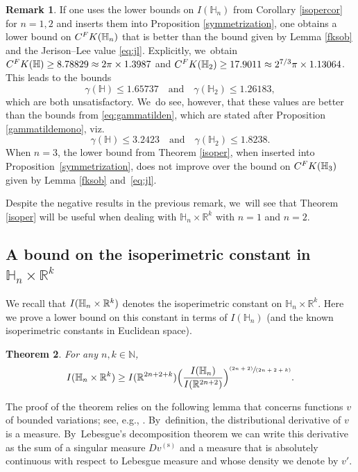 \documentclass[11pt]{article}
\let\oldsfrac\sfrac
\renewcommand{\sfrac}[2]{{\oldsfrac{#1}{#2}}}
\newcommand{\pspfrac}[2]{{\sfrac{(#1)}{(#2)}}}
\newcommand{\FK}{\textup{FK}}
\newtheorem{theorem}{Theorem}[section]
\theoremstyle{definition}
\newtheorem{remark}[theorem]{Remark}
\newcommand{\1}{\mathbbm{1}}
\newcommand{\N}{\mathbb{N}}
\newcommand{\R}{\mathbb{R}}
\numberwithin{equation}{section}
\begin{document}
\begin{remark}
If one uses the lower bounds on $I(\mathbb H_n)$ from Corollary \ref{isopercor} for $n=1,2$ and inserts them into Proposition \ref{symmetrization}, one obtains a lower bound on $C^\FK(\mathbb H_n)$ that is better than the bound given by Lemma \ref{fksob} and the Jerison--Lee value \eqref{eq:jl}. Explicitly, we~obtain $C^\FK(\mathbb H) \geq 8.78829 \approx 2\pi \times 1.3987$ and $C^\FK(\mathbb H_2) \geq 17.9011 \approx 2^{7/3} \pi \times 1.13064$. This leads to the bounds
\[
\gamma(\mathbb H) \leq 1.65737
\quad\text{and}\quad
\gamma(\mathbb H_2) \leq 1.26183,
\]
which are both unsatisfactory. We~do see, however, that these values are better than the bounds from \eqref{eq:gammatilden}, which are stated after Proposition \ref{gammatildemono}, viz.
\[
\gamma(\mathbb H) \leq 3.2423
\quad\text{and}\quad
\gamma(\mathbb H_2) \leq 1.8238.
\]
When $n=3$, the lower bound from Theorem \ref{isoper}, when inserted into Proposition~\ref{symmetrization}, does not improve over the bound on $C^\FK(\mathbb H_3)$ given by Lemma \ref{fksob} and~\eqref{eq:jl}.
\end{remark}

Despite the negative results in the previous remark, we~will see that Theorem \ref{isoper} will be useful when dealing with $\mathbb H_n\times\R^k$ with $n=1$ and $n=2$.

\subsection{A bound on the isoperimetric constant in $\mathbb H_n\times\R^k$}\label{sec:maincompn12}
We recall that $I(\mathbb H_n\times\nobreak\R^k)$ denotes the isoperimetric constant on $\mathbb H_n\times\R^k$. Here we prove a lower bound on this constant in terms of $I(\mathbb H_n)$ (and the known isoperimetric constants in Euclidean space).

\begin{theorem}\label{isoperk}
For any $n,k\in\N$,
\[
I(\mathbb H_n\times\R^k) \geq I(\R^{2n+2+k}) \Bigl(\frac{I(\mathbb H_n)}{I(\R^{2n+2})}\Bigr)^\pspfrac{2n+2}{2n+2+k}.
\]
\end{theorem}

The proof of the theorem relies on the following lemma that concerns functions $v$ of bounded variations; see, e.g., \cite[Chap.\,2 \& 7]{Leo}. By~definition, the distributional derivative of $v$ is a measure. By~Lebesgue's decomposition theorem we can write this derivative as the sum of a singular measure $Dv^{(\mathrm{s})}$ and a measure that is absolutely continuous with respect to Lebesgue measure and whose density we denote by $v'$.
\end{document}
